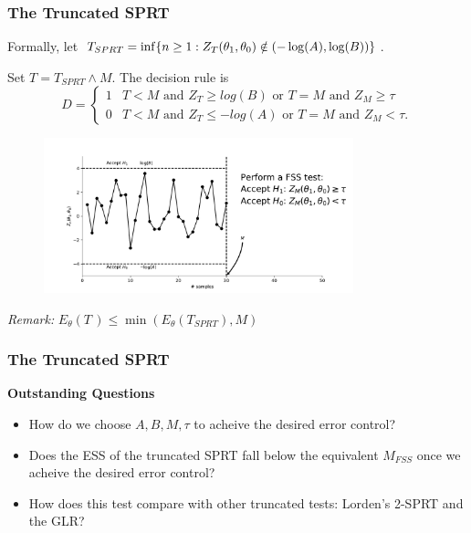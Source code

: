 \documentclass[10pt]{beamer}
\begin{document}
\begin{frame}
\frametitle{The Truncated SPRT}

Formally, let $T_{SPRT} = \inf\{n \geq 1 : Z_{T}(\theta_1, \theta_0) \notin (-\log(A), \log(B)) \}$.

Set $T = T_{SPRT} \wedge M$. The decision rule is
\[
D =
\begin{cases}
1  & T < M \text{ and } Z_T \geq log(B) \text{ or } T = M \text{ and } Z_M \geq \tau \\
0  & T < M \text{ and } Z_T \leq -log(A) \text{ or } T = M \text{ and } Z_M < \tau .
\end{cases}
\]

\begin{figure}
\centering
\includegraphics[height=0.45\textheight, width=0.8\textwidth]{images/truncated_sprt}
\end{figure}

\textit{Remark:} $E_{\theta}(T\,) \leq \min(E_{\theta}(T_{SPRT}), M)$
\end{frame}

\begin{frame}
\frametitle{The Truncated SPRT}
\textbf{Outstanding Questions}

\begin{itemize}
\item How do we choose $A, B, M, \tau$ to acheive the desired error control?
\item Does the ESS of the truncated SPRT fall below the equivalent $M_{FSS}$ once we acheive the desired error control?
\item How does this test compare with other truncated tests: Lorden's 2-SPRT and the GLR?
\end{itemize}

\end{frame}
\end{document}
